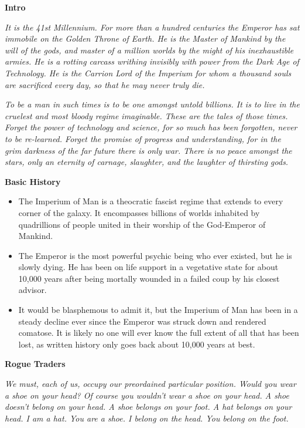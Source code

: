 \documentclass[10pt,a4paper]{article}
\newcommand{\rpgsection}[1]{%
  \vspace{0.8em}%
  {\headerfont\bfseries\Large #1}\par%
  \vspace{0.5em}%
}
\begin{document}
\begin{multicols}{2}

\rpgsection{Intro}
\textit{It is the 41st Millennium. For more than a hundred centuries the Emperor has sat immobile on the Golden Throne of Earth. He is the Master of Mankind by the will of the gods, and master of a million worlds by the might of his inexhaustible armies. He is a rotting carcass writhing invisibly with power from the Dark Age of Technology. He is the Carrion Lord of the Imperium for whom a thousand souls are sacrificed every day, so that he may never truly die.}

\textit{To be a man in such times is to be one amongst untold billions. It is to live in the cruelest and most bloody regime imaginable. These are the tales of those times. Forget the power of technology and science, for so much has been forgotten, never to be re-learned. Forget the promise of progress and understanding, for in the grim darkness of the far future there is only war. There is no peace amongst the stars, only an eternity of carnage, slaughter, and the laughter of thirsting gods.}

\rpgsection{Basic History}
\begin{itemize}
  \item The Imperium of Man is a theocratic fascist regime that extends to every corner of the galaxy. It encompasses billions of worlds inhabited by quadrillions of people united in their worship of the God-Emperor of Mankind.
  \item The Emperor is the most powerful psychic being who ever existed, but he is slowly dying. He has been on life support in a vegetative state for about 10,000 years after being mortally wounded in a failed coup by his closest advisor.
  \item It would be blasphemous to admit it, but the Imperium of Man has been in a steady decline ever since the Emperor was struck down and rendered comatose. It is likely no one will ever know the full extent of all that has been lost, as written history only goes back about 10,000 years at best.
\end{itemize}

\rpgsection{Rogue Traders}
\textit{We must, each of us, occupy our preordained particular position. Would you wear a shoe on your head? Of course you wouldn't wear a shoe on your head. A shoe doesn't belong on your head. A shoe belongs on your foot. A hat belongs on your head. I am a hat. You are a shoe. I belong on the head. You belong on the foot.}


\end{multicols}
\end{document}
